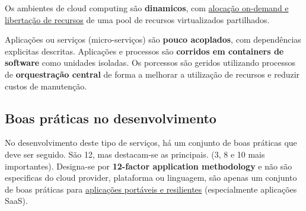 \documentclass{article}
\begin{document}
Os ambientes de cloud computing são \textbf{dinamicos}, com
\uline{alocação on-demand e libertação de recursos} de uma pool
de recursos virtualizados partilhados.

Aplicações ou serviços (micro-serviços) são \textbf{pouco acoplados},
com dependências explicitas descritas.
Aplicações e processos são \textbf{corridos em containers de software}
como unidades isoladas. Os porcessos são geridos utilizando processos de
\textbf{orquestração central} de forma a melhorar a utilização de recursos
e reduzir custos de manutenção.

\subsection{Boas práticas no desenvolvimento}

No desenvolvimento deste tipo de serviços, há um conjunto de boas práticas que deve ser
seguido. São 12, mas destacam-se as principais. (3, 8 e 10 mais importantes).
Designa-se por \textbf{12-factor application methodology} e não são especificas
do cloud provider, plataforma ou linguagem, são apenas um conjunto de
boas práticas para \uline{aplicações portáveis e resilientes} (especialmente
aplicações SaaS).
\end{document}
